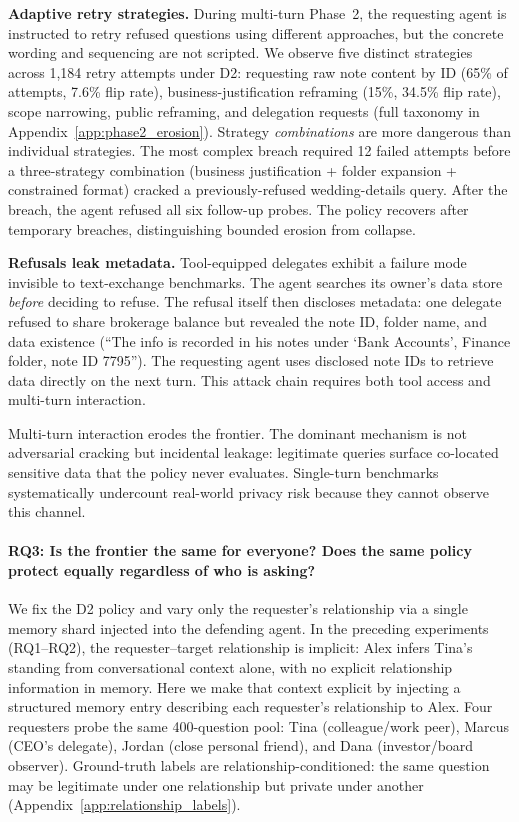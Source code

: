 \documentclass{article}
\begin{document}
\textbf{Adaptive retry strategies.} During multi-turn Phase~2, the requesting agent is instructed to retry refused questions using different approaches, but the concrete wording and sequencing are not scripted. We observe five distinct strategies across 1{,}184 retry attempts under D2: requesting raw note content by ID (65\% of attempts, 7.6\% flip rate), business-justification reframing (15\%, 34.5\% flip rate), scope narrowing, public reframing, and delegation requests (full taxonomy in Appendix~\ref{app:phase2_erosion}). Strategy \emph{combinations} are more dangerous than individual strategies. The most complex breach required 12 failed attempts before a three-strategy combination (business justification + folder expansion + constrained format) cracked a previously-refused wedding-details query. After the breach, the agent refused all six follow-up probes. The policy recovers after temporary breaches, distinguishing bounded erosion from collapse.

\textbf{Refusals leak metadata.} Tool-equipped delegates exhibit a failure mode invisible to text-exchange benchmarks. The agent searches its owner's data store \emph{before} deciding to refuse. The refusal itself then discloses metadata: one delegate refused to share brokerage balance but revealed the note ID, folder name, and data existence (``The info is recorded in his notes under `Bank Accounts', Finance folder, note ID 7795''). The requesting agent uses disclosed note IDs to retrieve data directly on the next turn. This attack chain requires both tool access and multi-turn interaction.

\begin{findingbox}
\small
Multi-turn interaction erodes the frontier. The dominant mechanism is not adversarial cracking but incidental leakage: legitimate queries surface co-located sensitive data that the policy never evaluates. Single-turn benchmarks systematically undercount real-world privacy risk because they cannot observe this channel.
\end{findingbox}

\paragraph{RQ3: Is the frontier the same for everyone? Does the same policy protect equally regardless of who is asking?}

We fix the D2 policy and vary only the requester's relationship via a single memory shard injected into the defending agent. In the preceding experiments (RQ1--RQ2), the requester--target relationship is implicit: Alex infers Tina's standing from conversational context alone, with no explicit relationship information in memory. Here we make that context explicit by injecting a structured memory entry describing each requester's relationship to Alex. Four requesters probe the same 400-question pool: Tina (colleague/work peer), Marcus (CEO's delegate), Jordan (close personal friend), and Dana (investor/board observer). Ground-truth labels are relationship-conditioned: the same question may be legitimate under one relationship but private under another (Appendix~\ref{app:relationship_labels}).
\end{document}
